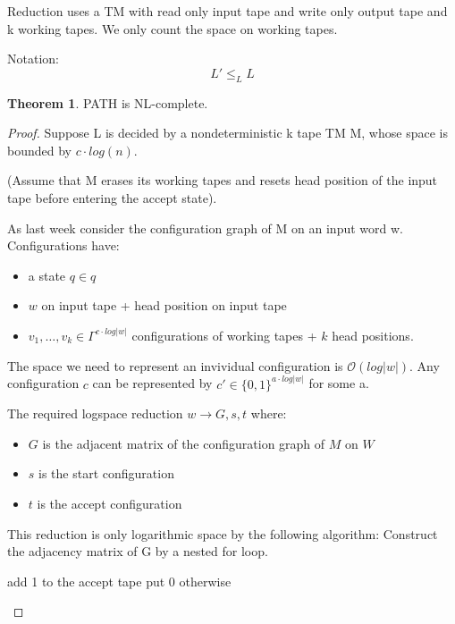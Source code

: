 \documentclass[a4paper,12pt]{article}
\theoremstyle{definition}
\newtheorem{theorem}[counter]{Theorem}
\theoremstyle{remark}
\begin{document}
Reduction uses a TM with read only input tape and write only output tape and k working tapes. We only count the space on working tapes.

Notation:
\begin{equation*}
    L' \leq_L L
\end{equation*}

\begin{theorem}
    PATH is NL-complete.
\end{theorem}

\begin{proof}
    Suppose L is decided by a nondeterministic k tape TM M, whose space is bounded by $c \cdot log(n)$.

    (Assume that M erases its working tapes and resets head position of the input tape before entering the accept state).

    As last week consider the configuration graph of M on an input word w. Configurations have:
    \begin{itemize}
        \item a state $q \in q$
        \item $w$ on input tape + head position on input tape
        \item $v_1, \dots, v_k \in \Gamma^{c \cdot log |w|}$ configurations of working tapes + $k$ head positions.
    \end{itemize}

    The space we need to represent an invividual configuration is $\mathscr{O}(log |w|)$. Any configuration $c$ can be represented
    by $c' \in \{0, 1\}^{a \cdot log|w|}$ for some a.

    The required logspace reduction $w \to G, s, t$ where:
    \begin{itemize}
        \item $G$ is the adjacent matrix of the configuration graph of $M$ on $W$
        \item $s$ is the start configuration
        \item $t$ is the accept configuration
    \end{itemize}

    This reduction is only logarithmic space by the following algorithm:
    Construct the adjacency matrix of G by a nested for loop.

    \begin{algorithm}[H]
        \begin{algorithmic}[1]
                        \State add 1 to the accept tape
                    \Else
                        \State put 0 otherwise
                    \EndIf
                \EndFor
            \EndFor
        \end{algorithmic}
        \end{algorithm}
\end{proof}
\end{document}
